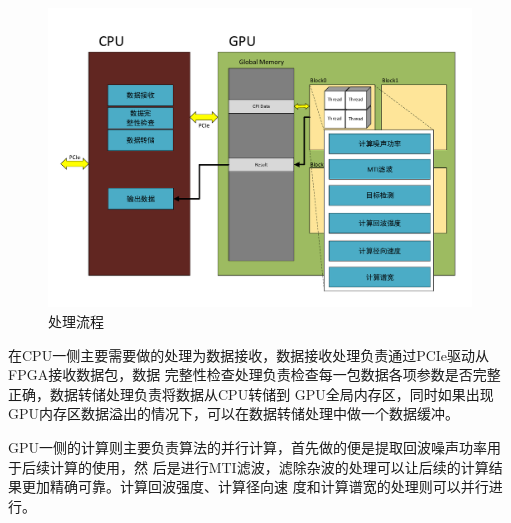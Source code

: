 \documentclass[a4paper,12pt]{report}
\begin{document}
\begin{spacing}{1.5}
\begin{figure}[htbp]
    \centering
    \includegraphics [width=1.0\textwidth]{figure//countflow.pdf}
    \caption{处理流程}\label{countflow}
    \end{figure}
\end{spacing}

在CPU一侧主要需要做的处理为数据接收，数据接收处理负责通过PCIe驱动从FPGA接收数据包，数据
完整性检查处理负责检查每一包数据各项参数是否完整正确，数据转储处理负责将数据从CPU转储到
GPU全局内存区，同时如果出现GPU内存区数据溢出的情况下，可以在数据转储处理中做一个数据缓冲。

GPU一侧的计算则主要负责算法的并行计算，首先做的便是提取回波噪声功率用于后续计算的使用，然
后是进行MTI滤波，滤除杂波的处理可以让后续的计算结果更加精确可靠。计算回波强度、计算径向速
度和计算谱宽的处理则可以并行进行。

\end{document}
